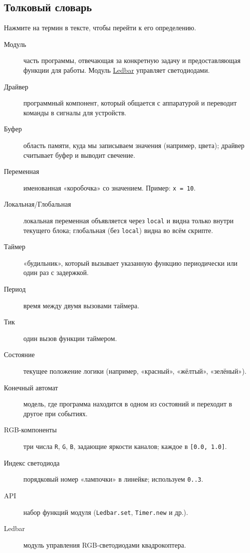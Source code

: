 \subsection{Толковый словарь}
Нажмите на термин в тексте, чтобы перейти к его определению.
\begin{description}
  \item[\hypertarget{term:module}{Модуль}] часть программы, отвечающая за конкретную задачу и предоставляющая функции для работы. Модуль \hyperlink{term:ledbar}{Ledbar} управляет светодиодами.
  \item[\hypertarget{term:driver}{Драйвер}] программный компонент, который общается с аппаратурой и переводит команды в сигналы для устройств.
  \item[\hypertarget{term:buffer}{Буфер}] область памяти, куда мы записываем значения (например, цвета); драйвер считывает буфер и выводит свечение.
  \item[\hypertarget{term:variable}{Переменная}] именованная «коробочка» со значением. Пример: \verb|x = 10|.
  \item[\hypertarget{term:scope}{Локальная/Глобальная}] локальная переменная объявляется через \verb|local| и видна только внутри текущего блока; глобальная (без \verb|local|) видна во всём скрипте.
  \item[\hypertarget{term:timer}{Таймер}] «будильник», который вызывает указанную функцию периодически или один раз с задержкой.
  \item[\hypertarget{term:period}{Период}] время между двумя вызовами таймера.
  \item[\hypertarget{term:tick}{Тик}] один вызов функции таймером.
  \item[\hypertarget{term:state}{Состояние}] текущее положение логики (например, «красный», «жёлтый», «зелёный»).
  \item[\hypertarget{term:automaton}{Конечный автомат}] модель, где программа находится в одном из состояний и переходит в другое при событиях.
  \item[\hypertarget{term:rgb}{RGB-компоненты}] три числа \verb|R|, \verb|G|, \verb|B|, задающие яркости каналов; каждое в \verb|[0.0, 1.0]|.
  \item[\hypertarget{term:index}{Индекс светодиода}] порядковый номер «лампочки» в линейке; используем \verb|0..3|.
  \item[\hypertarget{term:api}{API}] набор функций модуля (\verb|Ledbar.set|, \verb|Timer.new| и др.).
  \item[\hypertarget{term:ledbar}{Ledbar}] модуль управления RGB-светодиодами квадрокоптера.
\end{description}

